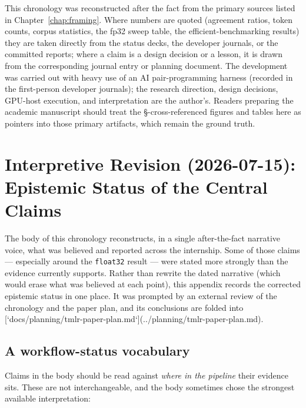 \documentclass[11pt]{report}
\newcommand{\code}[1]{\texttt{#1}}
\begin{document}
This chronology was reconstructed after the fact from the primary sources listed in
Chapter~\ref{chap:framing}. Where numbers are quoted (agreement ratios, token
counts, corpus statistics, the fp32 sweep table, the efficient-benchmarking results)
they are taken directly from the status decks, the developer journals, or the
committed reports; where a claim is a design decision or a lesson, it is drawn from
the corresponding journal entry or planning document. The development was carried
out with heavy use of an AI pair-programming harness (recorded in the first-person
developer journals); the research direction, design decisions, GPU-host execution,
and interpretation are the author's. Readers preparing the academic manuscript
should treat the \S-cross-referenced figures and tables here as pointers into those
primary artifacts, which remain the ground truth.

\chapter{Interpretive Revision (2026-07-15): Epistemic Status of the Central Claims}
\label{app:revision}

The body of this chronology reconstructs, in a single after-the-fact narrative
voice, what was believed and reported across the internship. Some of those claims
--- especially around the \code{float32} result --- were stated more strongly than
the evidence currently supports. Rather than rewrite the dated narrative (which
would erase what was believed at each point), this appendix records the corrected
epistemic status in one place. It was prompted by an external review of the
chronology and the paper plan, and its conclusions are folded into
[`docs/planning/tmlr-paper-plan.md`](../planning/tmlr-paper-plan.md).

\section{A workflow-status vocabulary}

Claims in the body should be read against \emph{where in the pipeline} their
evidence sits. These are not interchangeable, and the body sometimes chose the
strongest available interpretation:
\end{document}
